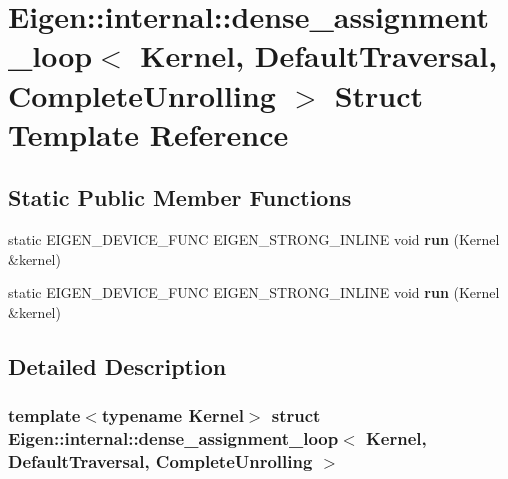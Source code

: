 \hypertarget{struct_eigen_1_1internal_1_1dense__assignment__loop_3_01_kernel_00_01_default_traversal_00_01_complete_unrolling_01_4}{}\section{Eigen\+:\+:internal\+:\+:dense\+\_\+assignment\+\_\+loop$<$ Kernel, Default\+Traversal, Complete\+Unrolling $>$ Struct Template Reference}
\label{struct_eigen_1_1internal_1_1dense__assignment__loop_3_01_kernel_00_01_default_traversal_00_01_complete_unrolling_01_4}
\subsection*{Static Public Member Functions}
\begin{DoxyCompactItemize}
\item 
\mbox{\label{struct_eigen_1_1internal_1_1dense__assignment__loop_3_01_kernel_00_01_default_traversal_00_01_complete_unrolling_01_4_ae2963af4736cb63500650702da959d3f}} 
static E\+I\+G\+E\+N\+\_\+\+D\+E\+V\+I\+C\+E\+\_\+\+F\+U\+NC E\+I\+G\+E\+N\+\_\+\+S\+T\+R\+O\+N\+G\+\_\+\+I\+N\+L\+I\+NE void {\bfseries run} (Kernel \&kernel)
\item 
\mbox{\label{struct_eigen_1_1internal_1_1dense__assignment__loop_3_01_kernel_00_01_default_traversal_00_01_complete_unrolling_01_4_ae2963af4736cb63500650702da959d3f}} 
static E\+I\+G\+E\+N\+\_\+\+D\+E\+V\+I\+C\+E\+\_\+\+F\+U\+NC E\+I\+G\+E\+N\+\_\+\+S\+T\+R\+O\+N\+G\+\_\+\+I\+N\+L\+I\+NE void {\bfseries run} (Kernel \&kernel)
\end{DoxyCompactItemize}


\subsection{Detailed Description}
\subsubsection*{template$<$typename Kernel$>$\newline
struct Eigen\+::internal\+::dense\+\_\+assignment\+\_\+loop$<$ Kernel, Default\+Traversal, Complete\+Unrolling $>$}




